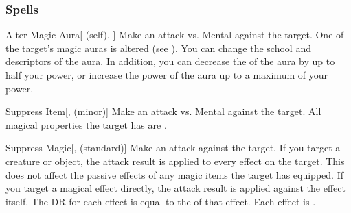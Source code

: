 \subsubsection{Spells}


\lowercase{\hypertarget{spell:Alter Magic Aura}{}}\label{spell:Alter Magic Aura}
\begin{attuneability}[\nth{1}]{\hypertarget{spell:Alter Magic Aura}{Alter Magic Aura}}[ (self), ]
Make an attack vs. Mental against the target.
\hit One of the target's magic auras is altered (see ).
You can change the school and descriptors of the aura.
In addition, you can decrease the  of the aura by up to half your power, or increase the power of the aura up to a maximum of your power.
\end{attuneability}
\vspace{0.25em}



\lowercase{\hypertarget{spell:Suppress Item}{}}\label{spell:Suppress Item}
\begin{freeability}[\nth{1}]{\hypertarget{spell:Suppress Item}{Suppress Item}}[,  (minor)]
Make an attack vs. Mental against the target.
\hit All magical properties the target has are .
\end{freeability}
\vspace{0.25em}



\lowercase{\hypertarget{spell:Suppress Magic}{}}\label{spell:Suppress Magic}
\begin{freeability}[\nth{1}]{\hypertarget{spell:Suppress Magic}{Suppress Magic}}[,  (standard)]
Make an attack against the target.
If you target a creature or object, the attack result is applied to every  effect on the target.
This does not affect the passive effects of any magic items the target has equipped.
If you target a magical effect directly, the attack result is applied against the effect itself.
The DR for each effect is equal to the  of that effect.
\hit Each effect is .
\end{freeability}
\vspace{0.25em}



